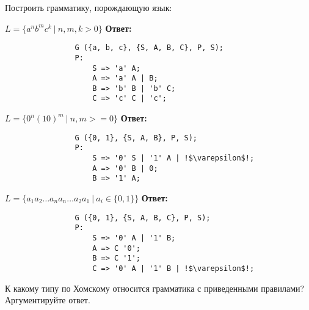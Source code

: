 \documentclass[]{article}
\begin{document}
\begin{enumerate}
\begin{item}
\begin{enumerate}
    \end{enumerate}
\end{item}

\begin{item}
    Построить грамматику, порождающую язык:
    \begin{enumerate}
    
        \begin{item}
            $L = \{ a^n b^m c^k\ |\  n, m, k > 0 \}$
            \bigbreak
            \textbf{Ответ:}
            \begin{lstlisting}
                G ({a, b, c}, {S, A, B, C}, P, S);
                P:
                    S => 'a' A;
                    A => 'a' A | B;
                    B => 'b' B | 'b' C;
                    C => 'c' C | 'c';
            \end{lstlisting}
        \end{item}

        \begin{item}
            $L = \{ 0^n (10)^m \ |\  n, m >= 0 \}$
            \bigbreak
            \textbf{Ответ:}
            \begin{lstlisting}
                G ({0, 1}, {S, A, B}, P, S);
                P:
                    S => '0' S | '1' A | !$\varepsilon$!;
                    A => '0' B | 0;
                    B => '1' A;
            \end{lstlisting}
        \end{item}

        \begin{item}
            $L = \{ a_1 a_2 \dots a_n a_n \dots a_2 a_1 \ |\  a_i \in \{ 0, 1 \} \}$
            \bigbreak
            \textbf{Ответ:}
            \begin{lstlisting}
                G ({0, 1}, {S, A, B, C}, P, S);
                P:
                    S => '0' A | '1' B;
                    A => C '0';
                    B => C '1';
                    C => '0' A | '1' B | !$\varepsilon$!;
            \end{lstlisting}
        \end{item}
    
    \end{enumerate}
\end{item}

\begin{item}
    К какому типу по Хомскому относится грамматика с приведенными правилами? Аргументируйте ответ.
    \begin{enumerate}
        

\end{enumerate}
\end{item}
\end{enumerate}
\end{document}

